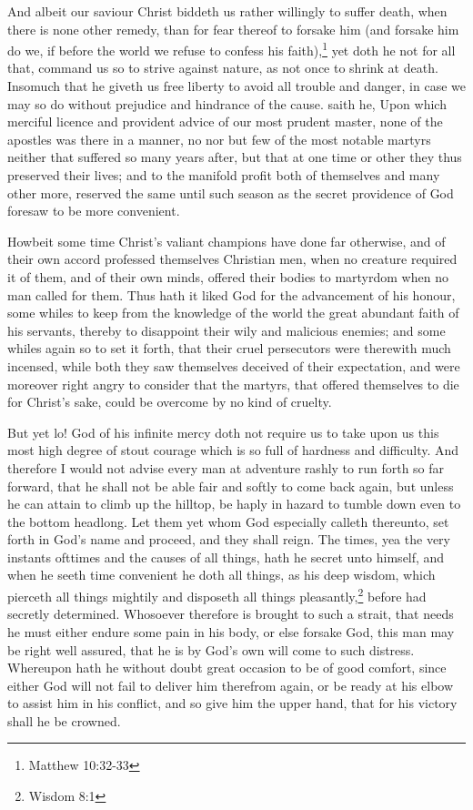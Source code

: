 \documentclass[a5paper]{scrbook}
\begin{document}
	And albeit our saviour Christ biddeth us rather willingly to suffer death, when there is none other remedy, than for fear thereof to forsake him (and forsake him do we, if before the world we refuse to confess his faith),\footnote{Matthew 10:32-33} yet doth he not for all that, command us so to strive against nature, as not once to shrink at death. Insomuch that he giveth us free liberty to avoid all trouble and danger, in case we may so do without prejudice and hindrance of the cause.  saith he,  Upon which merciful licence and provident advice of our most prudent master, none of the apostles was there in a manner, no nor but few of the most notable martyrs neither that suffered so many years after, but that at one time or other they thus preserved their lives; and to the manifold profit both of themselves and many other more, reserved the same until such season as the secret providence of God foresaw to be more convenient.
	
	Howbeit some time Christ's valiant champions have done far otherwise, and of their own accord professed themselves Christian men, when no creature required it of them, and of their own minds, offered their bodies to martyrdom when no man called for them. Thus hath it liked God for the advancement of his honour, some whiles to keep from the knowledge of the world the great abundant faith of his servants, thereby to disappoint their wily and malicious enemies; and some whiles again so to set it forth, that their cruel persecutors were therewith much incensed, while both they saw themselves deceived of their expectation, and were moreover right angry to consider that the martyrs, that offered themselves to die for Christ's sake, could be overcome by no kind of cruelty.
	
	But yet lo! God of his infinite mercy doth not require us to take upon us this most high degree of stout courage which is so full of hardness and difficulty. And therefore I would not advise every man at adventure rashly to run forth so far forward, that he shall not be able fair and softly to come back again, but unless he can attain to climb up the hilltop, be haply in hazard to tumble down even to the bottom headlong. Let them yet whom God especially calleth thereunto, set forth in God's name and proceed, and they shall reign. The times, yea the very instants ofttimes and the causes of all things, hath he secret unto himself, and when he seeth time convenient he doth all things, as his deep wisdom, which pierceth all things mightily and disposeth all things pleasantly,\footnote{Wisdom 8:1} before had secretly determined. Whosoever therefore is brought to such a strait, that needs he must either endure some pain in his body, or else forsake God, this man may be right well assured, that he is by God's own will come to such distress. Whereupon hath he without doubt great occasion to be of good comfort, since either God will not fail to deliver him therefrom again, or be ready at his elbow to assist him in his conflict, and so give him the upper hand, that for his victory shall he be crowned.
	
\end{document}
